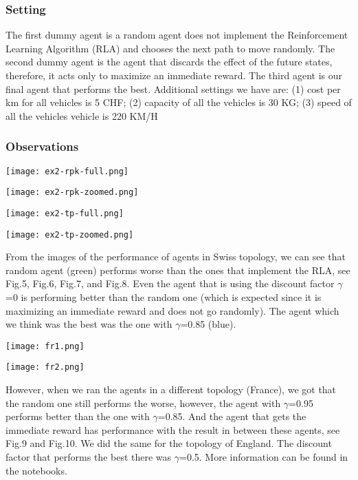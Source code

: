 \documentclass[11pt]{article}
\begin{document}
\subsubsection{Setting}
The first dummy agent is a random agent does not implement the Reinforcement Learning Algorithm (RLA) and chooses the next path to move randomly. The second dummy agent is the agent that discards the effect of the future states, therefore, it acts only to maximize an immediate reward. The third agent is our final agent that performs the best.
Additional settings we have are: (1) cost per km for all vehicles is 5 CHF; (2) capacity of all the vehicles is 30 KG; (3) speed of all the vehicles vehicle is 220 KM/H


\subsubsection{Observations}

\begin{multicols}{2}
\texttt{[image: ex2-rpk-full.png]}

\texttt{[image: ex2-rpk-zoomed.png]}
\end{multicols}

\begin{multicols}{2}
\texttt{[image: ex2-tp-full.png]}

\texttt{[image: ex2-tp-zoomed.png]}
\end{multicols}
From the images of the performance of agents in Swiss topology, we can see that random agent (green) performs worse than the ones that implement the RLA, see Fig.5, Fig.6, Fig.7, and Fig.8. Even the agent that is using the discount factor $\gamma$=0 is performing better than the random one (which is expected since it is maximizing an immediate reward and does not go randomly). The agent which we think was the best was the one with $\gamma$=0.85 (blue). 

\begin{multicols}{2}
\texttt{[image: fr1.png]}

\texttt{[image: fr2.png]}
\end{multicols}
However, when we ran the agents in a different topology (France), we got that the random one still performs the worse, however, the agent with $\gamma$=0.95 performs better than the one with $\gamma$=0.85. And the agent that gets the immediate reward has performance with the result in between these agents, see Fig.9 and Fig.10. We did the same for the topology of England. The discount factor that performs the best there was $\gamma$=0.5. More information can be found in the notebooks.
\end{document}
